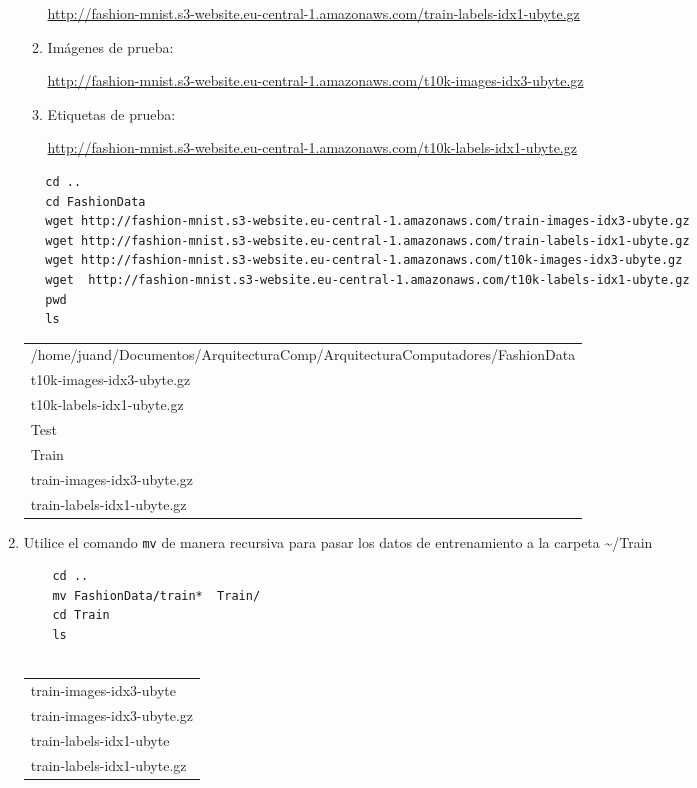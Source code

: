 \documentclass{article}
\begin{document}
\begin{enumerate}
\begin{enumerate}
\url{http://fashion-mnist.s3-website.eu-central-1.amazonaws.com/train-labels-idx1-ubyte.gz}
\item Imágenes de prueba:

\url{http://fashion-mnist.s3-website.eu-central-1.amazonaws.com/t10k-images-idx3-ubyte.gz}
\item Etiquetas de prueba:

\url{http://fashion-mnist.s3-website.eu-central-1.amazonaws.com/t10k-labels-idx1-ubyte.gz}
\end{enumerate}
\begin{verbatim}
   cd ..
   cd FashionData
   wget http://fashion-mnist.s3-website.eu-central-1.amazonaws.com/train-images-idx3-ubyte.gz
   wget http://fashion-mnist.s3-website.eu-central-1.amazonaws.com/train-labels-idx1-ubyte.gz
   wget http://fashion-mnist.s3-website.eu-central-1.amazonaws.com/t10k-images-idx3-ubyte.gz
   wget  http://fashion-mnist.s3-website.eu-central-1.amazonaws.com/t10k-labels-idx1-ubyte.gz
   pwd
   ls 
\end{verbatim}

\begin{table}[htbp]
\label{tab:org0de98f2}
\centering
\begin{tabular}{l}
/home/juand/Documentos/ArquitecturaComp/ArquitecturaComputadores/FashionData\\
t10k-images-idx3-ubyte.gz\\
t10k-labels-idx1-ubyte.gz\\
Test\\
Train\\
train-images-idx3-ubyte.gz\\
train-labels-idx1-ubyte.gz\\
\end{tabular}
\end{table}

\item Utilice el comando \texttt{mv} de manera recursiva para pasar los datos de
entrenamiento a la carpeta \textasciitilde{}/Train
\begin{verbatim}
    cd .. 
    mv FashionData/train*  Train/
    cd Train
    ls
    

\end{verbatim}

\begin{table}[htbp]
\label{tab:org407d623}
\centering
\begin{tabular}{l}
train-images-idx3-ubyte\\
train-images-idx3-ubyte.gz\\
train-labels-idx1-ubyte\\
train-labels-idx1-ubyte.gz\\
\end{tabular}
\end{table}


\end{enumerate}
\end{document}
